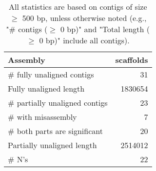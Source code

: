 \documentclass[12pt,a4paper]{article}
\begin{document}
\begin{table}[ht]
\begin{center}
\caption{All statistics are based on contigs of size $\geq$ 500 bp, unless otherwise noted (e.g., "\# contigs ($\geq$ 0 bp)" and "Total length ($\geq$ 0 bp)" include all contigs).}
\begin{tabular}{|l*{1}{|r}|}
\hline
Assembly & scaffolds \\ \hline
\# fully unaligned contigs & 31 \\ \hline
Fully unaligned length & 1830654 \\ \hline
\# partially unaligned contigs & 23 \\ \hline
\hspace{5mm}\# with misassembly & 7 \\ \hline
\hspace{5mm}\# both parts are significant & 20 \\ \hline
Partially unaligned length & 2514012 \\ \hline
\# N's & 22 \\ \hline
\end{tabular}
\end{center}
\end{table}
\end{document}
